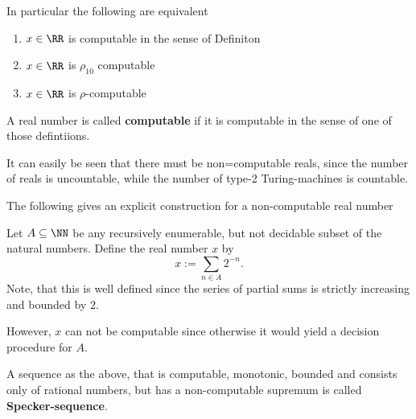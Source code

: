\begin{definition}
In particular the following are equivalent
\begin{theorem}
\begin{enumerate}
  \item $x \in \RR$ is computable in the sense of Definiton 
  \item $x \in \RR$ is $\rho_{10}$ computable
  \item $x \in \RR$ is $\rho$-computable
\end{enumerate}
\end{theorem}
A real number is called \textbf{computable} if it is computable in the sense of one of
those defintiions.

It can easily be seen that there must be non=computable reals, since the number
of reals is uncountable, while the number of type-2 Turing-machines is
countable.

The following gives an explicit construction for a non-computable real number
\begin{example}
Let $A \subseteq \NN$ be any recursively enumerable, but not decidable subset
of the natural numbers.
Define the real number $x$ by
$$ x := \sum_{n \in A} 2^{-n}. $$
Note, that this is well defined since the series of partial sums is strictly
increasing and bounded by $2$.

However, $x$ can not be computable since otherwise it would yield a decision
procedure for $A$. 
\end{example}
A sequence as the above, that is computable, monotonic, bounded and consists
only of rational numbers, but has a non-computable supremum is called \textbf{Specker-sequence}.


\end{definition}
